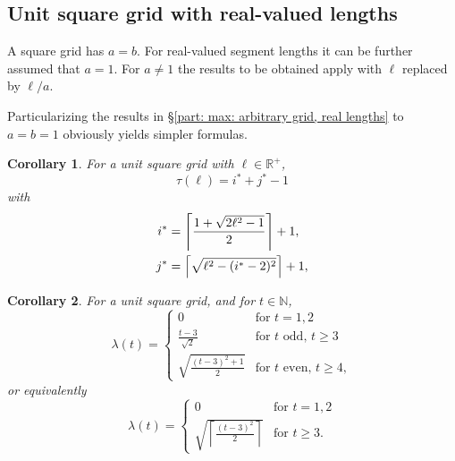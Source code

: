 \documentclass[12pt, a4paper]{article}
\let\Re\relax %
\DeclareMathOperator{\Re}{Re} %
\newcommand{\funt}{\tau} %
\newcommand{\funl}{\lambda} %
\newcommand{\len}{\ell} %
\newcommand{\tiles}{t} %
\newcommand{\isoli}{i^\ast}
\newcommand{\jsoli}{j^\ast}
\newtheorem{corollary}{Corollary}%
\begin{document}
\subsection{Unit square grid with real-valued lengths}
\label{part: max: unit square grid, real lengths}

A square grid has $a=b$. For real-valued segment lengths it can be further assumed that $a=1$. For $a \neq 1$ the results to be obtained apply with $\len$ replaced by $\len/a$.

Particularizing the results in \S\ref{part: max: arbitrary grid, real lengths} to $a=b=1$ obviously yields simpler formulas.

\begin{corollary}
\label{cor: funt, sq, form}
For a unit square grid with $\len \in \mathbb R^+$,
\begin{equation}
\label{eq: cor: funt, sq, form}
\funt(\len) = \isoli+\jsoli-1
\end{equation}
with
\begin{align}
\label{eq: cor: funt, sq, form; i}
\isoli &= \left\lceil \frac{1 + \Re \sqrt{2\len^2-1}}{2} \right\rceil + 1, \\
\label{eq: cor: funt, sq, form; j}
\jsoli &= \left\lceil \sqrt{\len^2-(\isoli-2)^2} \right\rceil + 1,
\end{align}
\end{corollary}

\begin{corollary}
\label{theo: funl, sq, form}
For a unit square grid, and for $\tiles \in \mathbb N$,
\begin{equation}
\funl(\tiles) = \begin{cases}
\displaystyle
0 & \text{for } \tiles =1, 2 \\[1.4mm]
\displaystyle
\frac{\tiles-3}{\sqrt{2}} & \text{for } \tiles \text{ odd, } \tiles \geq 3 \\[4.5mm]
\displaystyle
\sqrt{\frac{(\tiles-3)^2+1} {2}} & \text{for } \tiles \text{ even, } \tiles \geq 4,
\end{cases}
\end{equation}
or equivalently
\begin{equation}
\label{eq: theo: funt, sq, form; funl}
\funl(\tiles) = \begin{cases}
\displaystyle
0 & \text{for } \tiles =1, 2 \\[1.4mm]
\displaystyle
\sqrt{\left\lceil \frac{(\tiles-3)^2} {2} \right\rceil} & \text{for } \tiles \geq 3.
\end{cases}
\end{equation}
\end{corollary}
\end{document}
